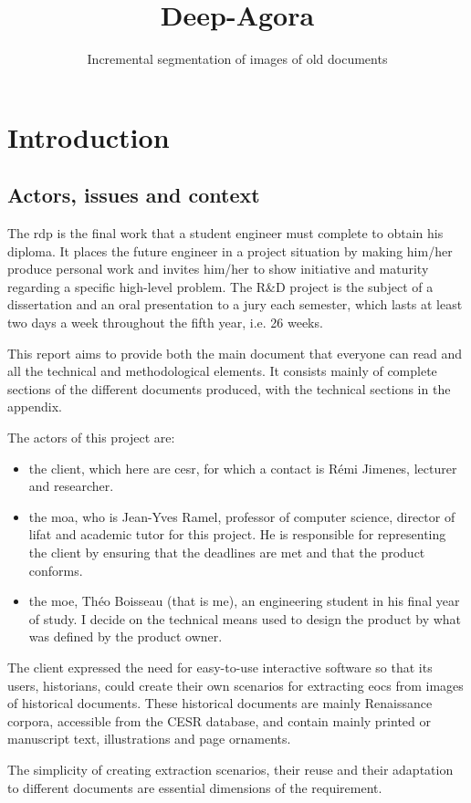 \documentclass{polytech/polytech}
\title{Deep-Agora}
\subtitle{Incremental segmentation of images of old documents}
\numberwithin{figure}{chapter}
\begin{document}
             
\chapter{Introduction}
\section{Actors, issues and context}

The \gls{rdp} is the final work that a student engineer must complete to obtain his diploma.
It places the future engineer in a project situation by making him/her produce personal work and invites him/her to show initiative and maturity regarding a specific high-level problem.
The R\&D project is the subject of a dissertation and an oral presentation to a jury each semester, which lasts at least two days a week throughout the fifth year, i.e. 26 weeks.

This report aims to provide both the main document that everyone can read and all the technical and methodological elements.
It consists mainly of complete sections of the different documents produced, with the technical sections in the appendix.

The actors of this project are:
\begin{itemize}
\item the client, which here are \gls{cesr}, for which a contact is Rémi Jimenes, lecturer and researcher.
\item the \gls{moa}, who is Jean-Yves Ramel, professor of computer science, director of \gls{lifat} and academic tutor for this project.
He is responsible for representing the client by ensuring that the deadlines are met and that the product conforms.
\item the \gls{moe}, Théo Boisseau (that is me), an engineering student in his final year of study.
I decide on the technical means used to design the product by what was defined by the product owner.
\end{itemize}

The client expressed the need for easy-to-use interactive software so that its users, historians, could create their own scenarios for extracting \gls{eocs} from images of historical documents.
These historical documents are mainly Renaissance corpora, accessible from the CESR database, and contain mainly printed or manuscript text, illustrations and page ornaments.

The simplicity of creating extraction scenarios, their reuse and their adaptation to different documents are essential dimensions of the requirement.
\end{document}
